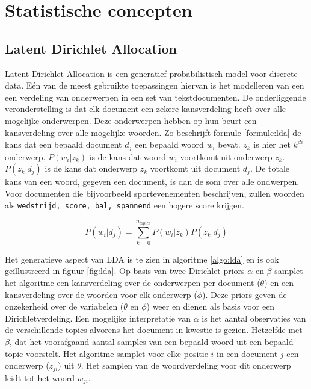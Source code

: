 \section{Statistische concepten}

\subsection{Latent Dirichlet Allocation}
Latent Dirichlet Allocation\cite{Blei2012} is een generatief probabilistisch model voor discrete data. E\'en van de meest gebruikte toepassingen hiervan is het modelleren van een een verdeling van onderwerpen in een set van tekstdocumenten. De onderliggende veronderstelling is dat elk document een zekere kansverdeling heeft over alle mogelijke onderwerpen. Deze onderwerpen hebben op hun beurt een kansverdeling over alle mogelijke woorden. Zo beschrijft formule \ref{formule:lda} de kans dat een bepaald document $d_j$ een bepaald woord $w_i$ bevat. $z_k$ is hier het $k^{de}$ onderwerp. $P(w_i|z_k)$ is de kans dat woord $w_i$ voortkomt uit onderwerp $z_k$. $P(z_k|d_j)$ is de kans dat onderwerp $z_k$ voortkomt uit document $d_j$. De totale kans van een woord, gegeven een document, is dan de som over alle ondwerpen. Voor documenten die bijvoorbeeld sportevenementen beschrijven, zullen woorden als \texttt{wedstrijd, score, bal, spannend} een hogere score krijgen.

\begin{equation}
    P(w_i | d_j) = \sum\limits_{k=0}^{n_{topics}}P(w_i|z_k)P(z_k|d_j)
    \label{formule:lda}
\end{equation}

Het generatieve aspect van LDA is te zien in algoritme \ref{algo:lda} en is ook ge\"illustreerd in figuur \ref{fig:lda}. Op basis van twee Dirichlet priors $\alpha$ en $\beta$ samplet het algoritme een kansverdeling over de onderwerpen per document ($\theta$) en een kansverdeling over de woorden voor elk onderwerp ($\phi$). Deze priors geven de onzekerheid over de variabelen ($\theta$ en $\phi$) weer en dienen als basis voor een Dirichletverdeling\cite{Huang2005}. Een mogelijke interpretatie van $\alpha$ is het aantal observaties van de verschillende topics alvorens het document in kwestie is gezien. Hetzelfde met $\beta$, dat het voorafgaand aantal samples van een bepaald woord uit een bepaald topic voorstelt. Het algoritme samplet voor elke positie $i$ in een document $j$ een onderwerp ($z_{ji}$) uit $\theta$. Het samplen van de woordverdeling voor dit onderwerp leidt tot het woord $w_{ji}$\cite{LDAsien}.

